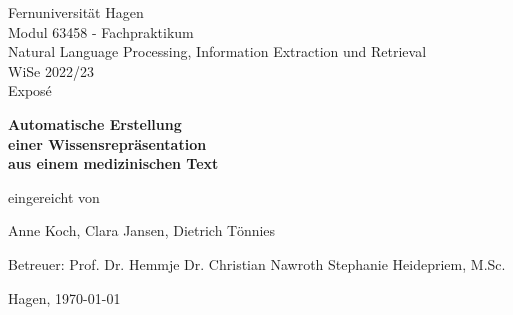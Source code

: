 \begin{titlepage}


\begin{center}

{\huge Fernuniversität Hagen} \\ [1,0cm]

{\Large Modul 63458 - Fachpraktikum \\ [0,3 cm]
Natural Language Processing, Information Extraction und Retrieval \\ [0,3 cm]
WiSe 2022/23} \\ [3cm]

{\huge Expos\'e}

\vspace{8ex}

{\huge\bfseries
Automatische Erstellung \\[0,5cm]
einer Wissensrepräsentation \\[0,5cm]
aus einem medizinischen Text \\[0,5cm]
}

\vspace{8ex}

{\large eingereicht von}

\vspace{4ex}

{\Large Anne Koch, Clara Jansen, Dietrich Tönnies}
 
\end{center}

\vspace{6ex}

{\Large \hspace{2,4cm} Betreuer:  Prof. Dr. Hemmje
\vspace{0,2cm}
  Dr. Christian Nawroth
\vspace{0,5cm}
 Stephanie Heidepriem, M.Sc.}

\vfill

\begin{center}
{\large Hagen, \today}
\end{center}

\end{titlepage}

